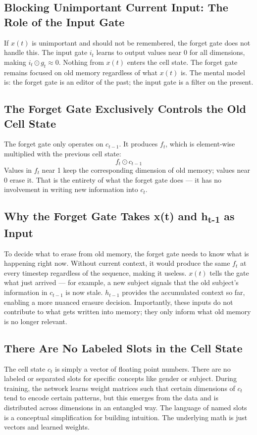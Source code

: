 \documentclass[12pt,a4paper]{article}
\begin{document}
\subsection{Blocking Unimportant Current Input: The Role of the Input Gate}
If $x(t)$ is unimportant and should not be remembered, the forget gate does not handle this. The input gate $i_t$ learns to output values near 0 for all dimensions, making $i_t \odot g_t \approx 0$. Nothing from $x(t)$ enters the cell state. The forget gate remains focused on old memory regardless of what $x(t)$ is. The mental model is: the forget gate is an editor of the past; the input gate is a filter on the present.

\subsection{The Forget Gate Exclusively Controls the Old Cell State}
The forget gate only operates on $c_{t-1}$. It produces $f_t$, which is element-wise multiplied with the previous cell state:
\[
f_t \odot c_{t-1}
\]
Values in $f_t$ near 1 keep the corresponding dimension of old memory; values near 0 erase it. That is the entirety of what the forget gate does --- it has no involvement in writing new information into $c_t$.

\subsection{Why the Forget Gate Takes x(t) and h\textsubscript{t-1} as Input}
To decide what to erase from old memory, the forget gate needs to know what is happening right now. Without current context, it would produce the same $f_t$ at every timestep regardless of the sequence, making it useless. $x(t)$ tells the gate what just arrived --- for example, a new subject signals that the old subject's information in $c_{t-1}$ is now stale. $h_{t-1}$ provides the accumulated context so far, enabling a more nuanced erasure decision. Importantly, these inputs do not contribute to what gets written into memory; they only inform what old memory is no longer relevant.

\subsection{There Are No Labeled Slots in the Cell State}
The cell state $c_t$ is simply a vector of floating point numbers. There are no labeled or separated slots for specific concepts like gender or subject. During training, the network learns weight matrices such that certain dimensions of $c_t$ tend to encode certain patterns, but this emerges from the data and is distributed across dimensions in an entangled way. The language of named slots is a conceptual simplification for building intuition. The underlying math is just vectors and learned weights.
\end{document}
